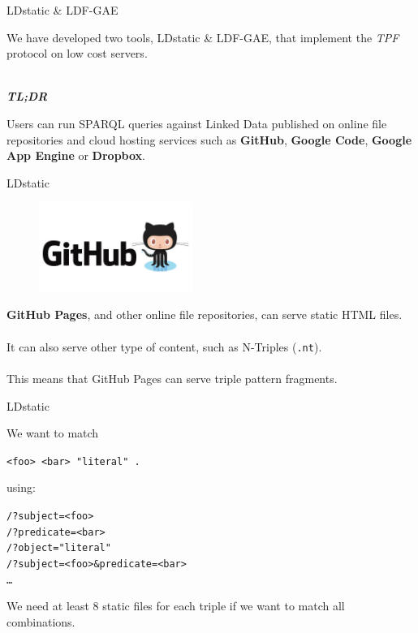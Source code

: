 \documentclass[20pt]{extarticle}
\begin{document}
{{\newpage


\begin{center}
{\fontsize{35}{35}\color{blue} \sc LDstatic \& LDF-GAE}
\end{center}
\vspace{20 mm}
{\fontsize{25}{25} {\cmr 
\noindent We have developed two tools, LDstatic \& LDF-GAE, that implement the \textit{TPF} protocol on low cost servers.
\\ \\
{\color{blue} 
\textbf{\textit{TL;DR}}

Users can run SPARQL queries against Linked Data published on online file repositories and cloud hosting services such as \textbf{GitHub}, \textbf{Google Code}, \textbf{Google App Engine} or \textbf{Dropbox}.
}
}} 


\newpage

\begin{center}
{\fontsize{35}{35}\color{blue} \sc LDstatic}
\end{center}
\begin{figure}[ht!]

\includegraphics[width=50mm]{GitHub.jpg}
\end{figure}
\vspace{5 mm}
{\fontsize{30}{30} {\cmr 
\noindent \textbf{GitHub Pages}, and other online file repositories, can serve static HTML files.
\\ \\
It can also serve other type of content, such as N-Triples (\texttt{.nt}).
\\ \\
This means that GitHub Pages can serve triple pattern fragments.
}} 


\newpage

\begin{center}
{\fontsize{35}{35}\color{blue} \sc LDstatic}
\end{center}
\vspace{10 mm}
{\fontsize{30}{30} {\cmr 
\noindent We want to match}}
\begin{alltt}
\texttt{<foo> <bar> "literal" .}
\end{alltt}
{\fontsize{30}{30} {\cmr using:}}
\begin{alltt}
/?subject=<foo>
/?predicate=<bar>
/?object="literal"
/?subject=<foo>\&predicate=<bar>
\dots
\end{alltt}
{\fontsize{30}{30} {\cmr We need at least 8 static files for each triple if we want to match all combinations.
}} 

}}
\end{document}
